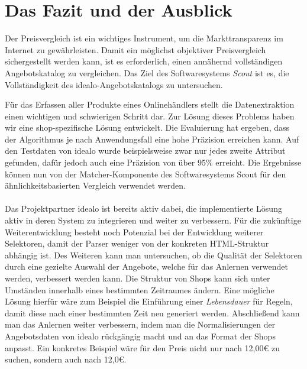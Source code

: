 \section{Das Fazit und der Ausblick}
\label{sec:abschluss}

Der Preisvergleich ist ein wichtiges Instrument, um die Markttransparenz im Internet zu gewährleisten.
Damit ein möglichst objektiver Preisvergleich sichergestellt werden kann, ist es erforderlich, einen annähernd
vollständigen Angebotskatalog zu vergleichen.
Das Ziel des Softwaresystems \textit{Scout} ist es, die Vollständigkeit des idealo-Angebotskatalogs zu untersuchen.

Für das Erfassen aller Produkte eines Onlinehändlers stellt die Datenextraktion einen wichtigen und schwierigen
Schritt dar.
Zur Lösung dieses Problems haben wir eine shop-spezifische Lösung entwickelt.
Die Evaluierung hat ergeben, dass der Algorithmus je nach Anwendungsfall eine hohe Präzision erreichen kann.
Auf den Testdaten von idealo wurde beispielsweise zwar nur jedes zweite Attribut gefunden, dafür jedoch auch eine
Präzision von über 95\% erreicht.
Die Ergebnisse können nun von der Matcher-Komponente des Softwaresystems Scout für den ähnlichkeitsbasierten
Vergleich verwendet werden.
\\
~\\
Das Projektpartner idealo ist bereits aktiv dabei, die implementierte Lösung aktiv in deren System zu
integrieren und weiter zu verbessern.
Für die zukünftige Weiterentwicklung besteht noch Potenzial bei der Entwicklung weiterer Selektoren, damit der Parser
weniger von der konkreten HTML-Struktur abhängig ist.
Des Weiteren kann man untersuchen, ob die Qualität der Selektoren durch eine gezielte Auswahl der Angebote, welche
für das Anlernen verwendet werden, verbessert werden kann.
Die Struktur von Shops kann sich unter Umständen innerhalb eines bestimmten Zeitraumes ändern.
Eine mögliche Lösung hierfür wäre zum Beispiel die Einführung einer \textit{Lebensdauer} für Regeln, damit diese nach
einer bestimmten Zeit neu generiert werden.
Abschließend kann man das Anlernen weiter verbessern, indem man die Normalisierungen der Angebotsdaten von idealo
rückgängig macht und an das Format der Shops anpasst.
Ein konkretes Beispiel wäre für den Preis nicht nur nach 12,00€ zu suchen, sondern auch nach 12,0€.